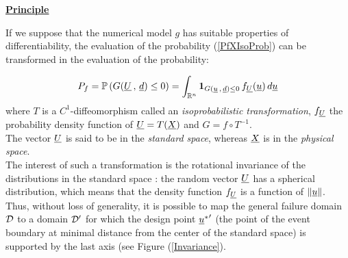 {  \vspace{2mm}

  \underline{\textbf{Principle}} \vspace{2mm}


  If we suppose that the numerical model $g$ has suitable properties of differentiability, the evaluation of the probability (\ref{PfXIsoProb}) can be transformed in the evaluation of the probability:

  \begin{equation}
    \label{StandardSpace}
    P_f = {\mathbb P}\left( G({\underline{U}}\,,\,{\underline{d}})\leq 0 \right) = \int_{{\mathbb R}^n} \boldsymbol{1}_{G({\underline{u}}\,,\,{\underline{d}}) \leq 0}\,f_{{\underline{U}}}({\underline{u}})\,d{\underline{u}}
  \end{equation}
  where $T$ is a $C^1$-diffeomorphism called an \emph{isoprobabilistic transformation}, $f_{{\underline{U}}}$ the probability density function of ${\underline{U}}=T({\underline{X}})$ and $G=f\circ T^{-1}$.\\
  The vector ${\underline{U}}$ is said to be in the \emph{standard space}, whereas ${\underline{X}}$ is in the \emph{physical space}.\\

  The interest of such a transformation is the rotational invariance of the distributions in the standard space : the random vector ${\underline{U}}$ has a spherical distribution, which means that the density function $f_{{\underline{U}}}$ is a function of $\|{\underline{u}}\|$. Thus, without loss of generality, it is possible to map the general failure domain ${{\mathcal D}}$ to a domain ${{\mathcal D}}'$ for which the design point ${{\underline{u}}^{*}}'$ (the point of the event boundary at minimal distance from the center of the standard space) is supported by the last axis (see Figure (\ref{Invariance}).



}

